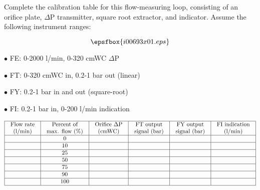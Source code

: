 

Complete the calibration table for this flow-measuring loop, consisting of an orifice plate, $\Delta$P transmitter, square root extractor, and indicator.  Assume the following instrument ranges:

$$\epsfbox{i00693x01.eps}$$

\medskip
\item{$\bullet$} FE: 0-2000 l/min, 0-320 cmWC $\Delta$P
\item{$\bullet$} FT: 0-320 cmWC in, 0.2-1 bar out (linear)
\item{$\bullet$} FY: 0.2-1 bar in and out (square-root)
\item{$\bullet$} FI: 0.2-1 bar in, 0-200 l/min indication
\medskip


$$\vbox{\offinterlineskip
\halign{\strut
\vrule \quad\hfil # \ \hfil & 
\vrule \quad\hfil # \ \hfil & 
\vrule \quad\hfil # \ \hfil & 
\vrule \quad\hfil # \ \hfil & 
\vrule \quad\hfil # \ \hfil & 
\vrule \quad\hfil # \ \hfil \vrule \cr
\noalign{\hrule}
%
Flow rate & Percent of & Orifice $\Delta$P & FT output & FY output & FI indication \cr
%
(l/min) & max. flow (\%) & (cmWC) & signal (bar) & signal (bar) & (l/min) \cr
%
\noalign{\hrule}
%
 & 0 &   &   &   &  \cr
%
\noalign{\hrule}
%
  & 10 &   &   &   &  \cr
%
\noalign{\hrule}
%
  & 25 &   &   &   &  \cr
%
\noalign{\hrule}
%
 & 50 &   &   &   &  \cr
%
\noalign{\hrule}
%
  & 75 &   &   &   &  \cr
%
\noalign{\hrule}
%
  & 90 &   &   &   &  \cr
%
\noalign{\hrule}
%
 & 100 &   &   &   &  \cr
%
\noalign{\hrule}
} %
}$$ %








